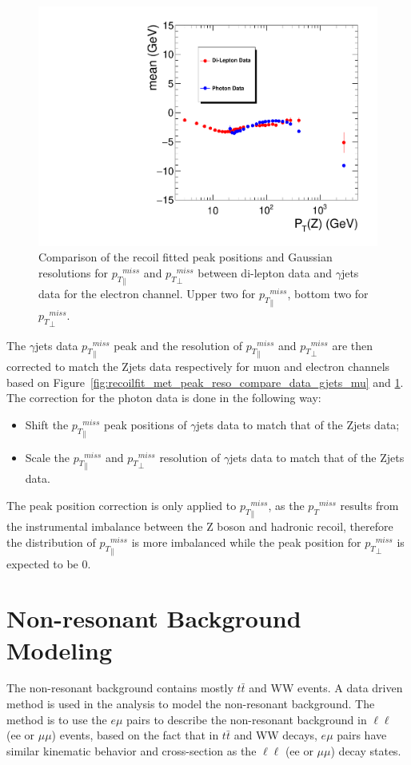 \begin{figure}[htbp]
\begin{center}
\includegraphics[width=0.46\linewidth, page=7]{figures/plots_SingleEMU_Run2016Full_03Feb2017_allcorV2_met_para_study_ZSelecLowLPt_el_VS_SinglePhoton_Run2016Full_03Feb2017_allcorV2_NoRecoil_met_para_study_ZSelecLowLPt_el.pdf}
\caption{Comparison of the recoil fitted peak positions and Gaussian resolutions for ${p_{T}}^{miss}_\parallel$ and ${p_{T}}^{miss}_\perp$ between di-lepton data and $\gamma$jets data for the electron channel. Upper two for 
${p_{T}}^{miss}_\parallel$, bottom two for ${p_{T}}^{miss}_\perp$.}
\label{fig:recoilfit_met_peak_reso_compare_data_gjets_el}
\end{center}
\end{figure}

The $\gamma$jets data ${p_{T}}^{miss}_\parallel$ peak and the resolution of ${p_{T}}^{miss}_\parallel$ and ${p_{T}}^{miss}_\perp$ are then corrected to match the Zjets data respectively for muon and electron channels based on Figure~\ref{fig:recoilfit_met_peak_reso_compare_data_gjets_mu} and \ref{fig:recoilfit_met_peak_reso_compare_data_gjets_el}. The correction for the photon data is done in the following way:
\begin{itemize}
\item Shift the ${p_{T}}^{miss}_\parallel$ peak positions of $\gamma$jets data to match that of the Zjets data;
\item Scale the ${p_{T}}^{miss}_\parallel$ and ${p_{T}}^{miss}_\perp$ resolution of $\gamma$jets data to match that of the Zjets data.
\end{itemize}

The peak position correction is only applied to ${p_{T}}^{miss}_\parallel$, as the ${p_{T}}^{miss}$ results from the instrumental imbalance between the Z boson and hadronic recoil, therefore the distribution of ${p_{T}}^{miss}_\parallel$ is more imbalanced while the peak position for ${p_{T}}^{miss}_\perp$ is expected to be 0.

\clearpage
\section{Non-resonant Background Modeling}
The non-resonant background contains mostly $t\bar{t}$ and WW events. A data driven method is used in the analysis to model the non-resonant background. The method is to use the $e\mu$ pairs to describe the non-resonant background in $\ell\ell$ (ee or $\mu \mu$) events, based on the fact that in $t\bar{t}$ and WW decays, $e\mu$ pairs have similar kinematic behavior and cross-section as the $\ell\ell$ (ee or $\mu \mu$) decay states.

